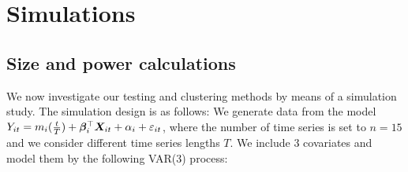 \documentclass[12pt]{article}
\begin{document}
\def\spacingset#1{\renewcommand{\baselinestretch}%
{#1}\small\normalsize} \spacingset{1}



\spacingset{1.8} %

\def\thesection{\Alph{section}}

\allowdisplaybreaks[4]

\setlength{\abovedisplayskip}{3pt}
\setlength{\belowdisplayskip}{3pt}



\section{Simulations}\label{sec:sim}

\subsection{Size and power calculations}\label{subsec:sim:main}

We now investigate our testing and clustering methods by means of a simulation study. The simulation design is as follows: We generate data from the model $Y_{it} = m_i(\frac{t}{T}) + \bm{\beta}_i^\top \boldsymbol{X}_{it} +  \alpha_i  + \varepsilon_{it}$, where the number of time series is set to $n = 15$ and we consider different time series lengths $T$. We include $3$ covariates and model them by the following VAR(3) process:
\end{document}
